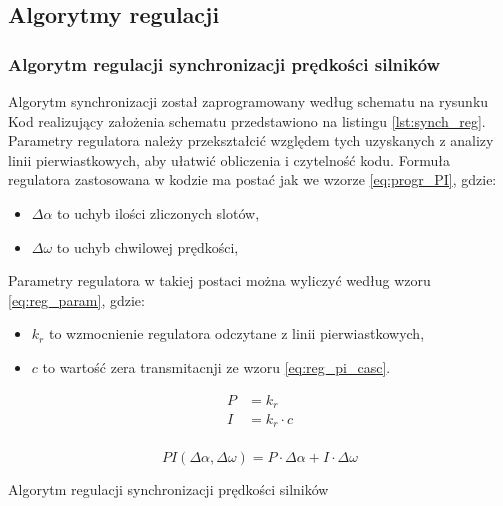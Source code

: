 \documentclass[11pt]{article}
\begin{document}
\subsection{Algorytmy regulacji}
\subsubsection{Algorytm regulacji synchronizacji prędkości silników}
Algorytm synchronizacji został zaprogramowany według schematu na rysunku %
Kod realizujący założenia schematu przedstawiono na listingu \ref{lst:synch_reg}.
Parametry regulatora należy przekształcić względem tych uzyskanych z analizy linii pierwiastkowych, aby ułatwić obliczenia i czytelność kodu.
Formuła regulatora zastosowana w kodzie ma postać jak we wzorze \ref{eq:progr_PI}, gdzie:
\begin{itemize}
	\item $ \Delta \alpha $ to uchyb ilości zliczonych slotów,
	\item $ \Delta \omega $ to uchyb chwilowej prędkości,
\end{itemize}
Parametry regulatora w takiej postaci można wyliczyć według wzoru \ref{eq:reg_param}, gdzie:
\begin{itemize}
	\item $ k_r $ to wzmocnienie regulatora odczytane z linii pierwiastkowych,
	\item $ c $ to wartość zera transmitacnji ze wzoru \ref{eq:reg_pi_casc}.
\end{itemize}

\begin{equation} \label{eq:reg_param}
\begin{aligned}
	P &=  k_r\\
	I &=  k_r \cdot c\\
\end{aligned}
\end{equation}


\begin{equation} \label{eq:progr_PI}
	PI \left( \Delta \alpha, \Delta \omega \right) = P \cdot \Delta \alpha + I \cdot \Delta \omega
\end{equation}


\begin{listing}[htb]
\caption{Algorytm regulacji synchronizacji prędkości silników}
\inputminted[firstline=161, lastline=183, frame=lines, linenos, breaklines]{cpp}{../src/platformMotors.cpp}
\label{lst:synch_reg}
\end{listing}
\end{document}
